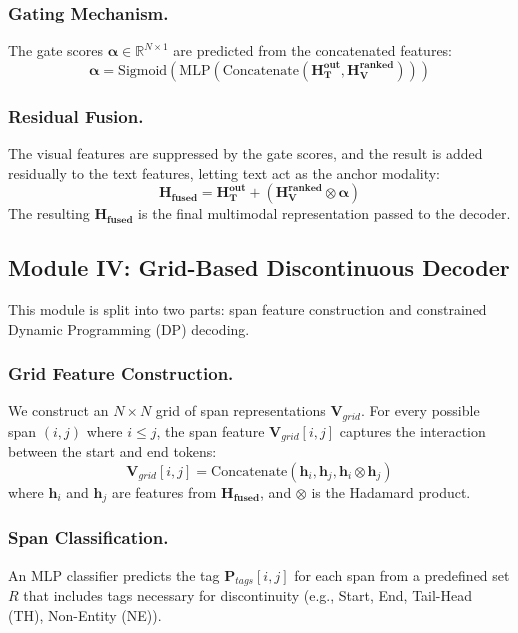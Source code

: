 \documentclass[runningheads]{llncs}
\begin{document}
\subsubsection{Gating Mechanism.}
The gate scores $\mathbf{\alpha} \in \mathbb{R}^{N \times 1}$ are predicted from the concatenated features:
\begin{equation}
\label{eq:gating}
\mathbf{\alpha} = \text{Sigmoid}(\text{MLP}(\text{Concatenate}(\mathbf{H_{T}^{out}}, \mathbf{H_{V}^{ranked}})))
\end{equation}

\subsubsection{Residual Fusion.}
The visual features are suppressed by the gate scores, and the result is added residually to the text features, letting text act as the anchor modality:
\begin{equation}
\label{eq:fusion}
\mathbf{H_{fused}} = \mathbf{H_{T}^{out}} + (\mathbf{H_{V}^{ranked}} \otimes \mathbf{\alpha})
\end{equation}
The resulting $\mathbf{H_{fused}}$ is the final multimodal representation passed to the decoder.

\subsection{Module IV: Grid-Based Discontinuous Decoder}
This module is split into two parts: span feature construction and constrained Dynamic Programming (DP) decoding.

\subsubsection{Grid Feature Construction.}
We construct an $N \times N$ grid of span representations $\mathbf{V}_{grid}$. For every possible span $(i, j)$ where $i \le j$, the span feature $\mathbf{V}_{grid}[i, j]$ captures the interaction between the start and end tokens:
\begin{equation}
\label{eq:span_feature}
\mathbf{V}_{grid}[i, j] = \text{Concatenate}(\mathbf{h}_{i}, \mathbf{h}_{j}, \mathbf{h}_{i} \otimes \mathbf{h}_{j})
\end{equation}
where $\mathbf{h}_{i}$ and $\mathbf{h}_{j}$ are features from $\mathbf{H_{fused}}$, and $\otimes$ is the Hadamard product.

\subsubsection{Span Classification.}
An MLP classifier predicts the tag $\mathbf{P}_{tags}[i, j]$ for each span from a predefined set $R$ that includes tags necessary for discontinuity (e.g., Start, End, Tail-Head (TH), Non-Entity (NE)).
\end{document}
